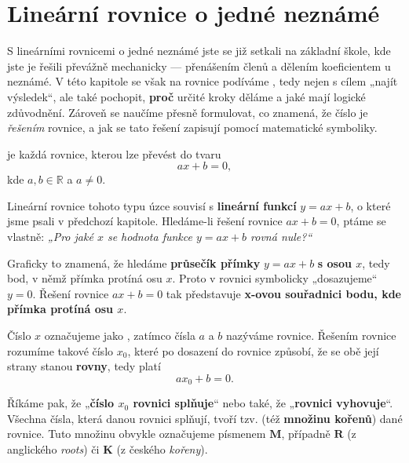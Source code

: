 \documentclass[12pt,a4paper]{article}
\begin{document}
\section{Lineární rovnice o jedné neznámé}


S lineárními rovnicemi o jedné neznámé jste se již setkali na základní škole, kde jste je řešili převážně mechanicky — přenášením členů a dělením koeficientem u neznámé.  
V této kapitole se však na rovnice podíváme , tedy nejen s cílem „najít výsledek“, ale také pochopit, \textbf{proč} určité kroky děláme a jaké mají logické zdůvodnění.  
Zároveň se naučíme přesně formulovat, co znamená, že číslo je \textit{řešením} rovnice, a jak se tato řešení zapisují pomocí matematické symboliky.

\begin{definitionbox}
     je každá rovnice, kterou lze převést do tvaru
    \[
    ax + b = 0,
    \]
    kde $a, b \in \mathbb{R}$ a $a \neq 0$.
\end{definitionbox}


Lineární rovnice tohoto typu úzce souvisí s \textbf{lineární funkcí} $y = ax + b$, o které jsme psali v předchozí kapitole.  
Hledáme-li řešení rovnice $ax + b = 0$, ptáme se vlastně:  
\emph{„Pro jaké $x$ se hodnota funkce $y = ax + b$ rovná nule?“}  

Graficky to znamená, že hledáme \textbf{průsečík přímky} $y = ax + b$ \textbf{s osou $x$}, tedy bod, v němž přímka protíná osu $x$.  
Proto v rovnici symbolicky „dosazujeme“ $y = 0$.  
Řešení rovnice $ax + b = 0$ tak představuje \textbf{x-ovou souřadnici bodu, kde přímka protíná osu $x$}.  


Číslo $x$ označujeme jako , zatímco čísla $a$ a $b$ nazýváme  rovnice.  
Řešením rovnice rozumíme takové číslo $x_0$, které po dosazení do rovnice způsobí, že se obě její strany stanou \textbf{rovny}, tedy platí
\[
a x_0 + b = 0.
\]

Říkáme pak, že „\textbf{číslo $x_0$ rovnici splňuje}“ nebo také, že „\textbf{rovnici vyhovuje}“.  
Všechna čísla, která danou rovnici splňují, tvoří tzv.  (též \textbf{množinu kořenů}) dané rovnice.  
Tuto množinu obvykle označujeme písmenem $\mathbf{M}$, případně $\mathbf{R}$ 
(z anglického \textit{roots}) či $\mathbf{K}$ (z českého \textit{kořeny}).  
\end{document}
